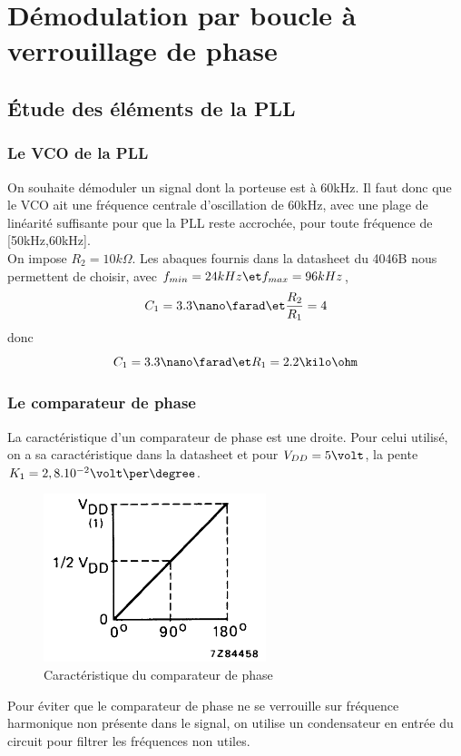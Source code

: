 \documentclass[../../Cours_M1.tex]{subfiles}
\begin{document}
\section{Démodulation par boucle à verrouillage de phase}

\subsection{Étude des éléments de la PLL}

\subsubsection{Le VCO de la PLL}

On souhaite démoduler un signal dont la porteuse est à 60kHz. Il faut donc que le VCO ait une fréquence centrale d'oscillation de 60kHz, avec une plage de linéarité suffisante pour que la PLL reste accrochée, pour toute fréquence de [50kHz,60kHz].\\

On impose $R_2 = 10k\Omega$. Les abaques fournis dans la datasheet du 4046B nous permettent de choisir, avec $f_{min}=24kHz \et f_{max}=96kHz$,  \[C_1=3.3 \nano\farad \et \frac{R_2}{R_1}=4\]
donc
\[C_1=3.3 \nano\farad \et R_1 = 2.2\kilo\ohm\]

\subsubsection{Le comparateur de phase}

La caractéristique d'un comparateur de phase est une droite. Pour celui utilisé, on a sa caractéristique dans la datasheet et pour $V_{DD}=5 \volt$, la pente $K_1 =  2,8.10^{-2} \volt\per\degree$.

\begin{figure}[h!]
\centering
\includegraphics[scale=0.8]{caracXOR.png}
\caption{Caractéristique du comparateur de phase}
\end{figure}

Pour éviter que le comparateur de phase ne se verrouille sur fréquence harmonique non présente dans le signal, on utilise un condensateur en entrée du circuit pour filtrer les fréquences non utiles.
\end{document}
